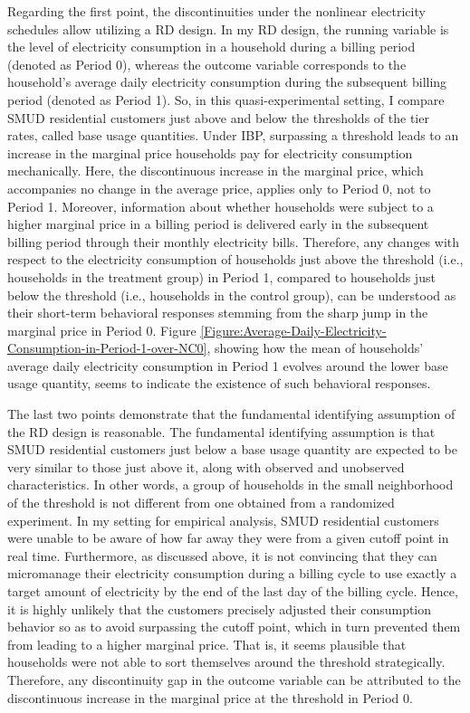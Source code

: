 Regarding the first point, the discontinuities under the nonlinear electricity schedules allow utilizing a RD design. In my RD design, the running variable is the level of electricity consumption in a household during a billing period (denoted as Period 0), whereas the outcome variable corresponds to the household's average daily electricity consumption during the subsequent billing period (denoted as Period 1). So, in this quasi-experimental setting, I compare SMUD residential customers just above and below the thresholds of the tier rates, called base usage quantities. Under IBP, surpassing a threshold leads to an increase in the marginal price households pay for electricity consumption mechanically. Here, the discontinuous increase in the marginal price, which accompanies no change in the average price, applies only to Period 0, not to Period 1. Moreover, information about whether households were subject to a higher marginal price in a billing period is delivered early in the subsequent billing period through their monthly electricity bills. Therefore, any changes with respect to the electricity consumption of households just above the threshold (i.e., households in the treatment group) in Period 1, compared to households just below the threshold (i.e., households in the control group), can be understood as their short-term behavioral responses stemming from the sharp jump in the marginal price in Period 0. Figure \ref{Figure:Average-Daily-Electricity-Consumption-in-Period-1-over-NC0}, showing how the mean of households' average daily electricity consumption in Period 1 evolves around the lower base usage quantity, seems to indicate the existence of such behavioral responses. 

The last two points demonstrate that the fundamental identifying assumption of the RD design is reasonable. The fundamental identifying assumption is that SMUD residential customers just below a base usage quantity are expected to be very similar to those just above it, along with observed and unobserved characteristics. In other words, a group of households in the small neighborhood of the threshold is not different from one obtained from a randomized experiment. In my setting for empirical analysis, SMUD residential customers were unable to be aware of how far away they were from a given cutoff point in real time. Furthermore, as discussed above, it is not convincing that they can micromanage their electricity consumption during a billing cycle to use exactly a target amount of electricity by the end of the last day of the billing cycle. Hence, it is highly unlikely that the customers precisely adjusted their consumption behavior so as to avoid surpassing the cutoff point, which in turn prevented them from leading to a higher marginal price. That is, it seems plausible that households were not able to sort themselves around the threshold strategically. Therefore, any discontinuity gap in the outcome variable can be attributed to the discontinuous increase in the marginal price at the threshold in Period 0. 
